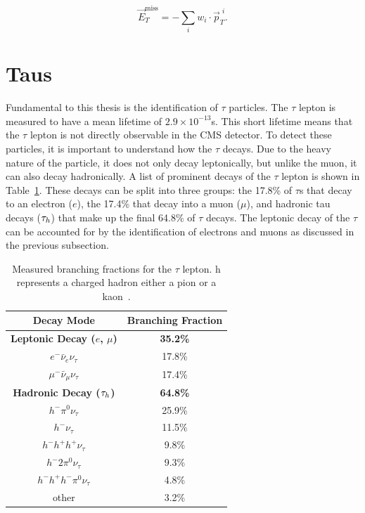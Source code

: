 \begin{equation}
\vec{E}_{T}^{\text{miss}} = - \sum_{i} w_{i} \cdot \vec{p}_{T}^{\hspace{4pt}i}.
\end{equation}

\section{Taus}
\label{sec:taus}

Fundamental to this thesis is the identification of $\tau$ particles.
The $\tau$ lepton is measured to have a mean lifetime of \(2.9 \times 10^{-13}\)s. 
This short lifetime means that the $\tau$ lepton is not directly observable in the \ac{CMS} detector.  
To detect these particles, it is important to understand how the $\tau$ decays. 
Due to the heavy nature of the particle, it does not only decay leptonically, but unlike the muon, it can also decay hadronically.
A list of prominent decays of the $\tau$ lepton is shown in Table~\ref{tab:tau_decay}.
These decays can be split into three groups: the 17.8\% of $\tau$s that decay to an electron ($e$), the 17.4\% that decay into a muon ($\mu$), and hadronic tau decays ($\tau_{h}$) that make up the final 64.8\% of $\tau$ decays. 
The leptonic decay of the $\tau$ can be accounted for by the identification of electrons and muons as discussed in the previous subsection.  \\

\begin{table}[h]
    \centering
    \begin{tabular}{|c|c|}
         \hline
         Decay Mode & Branching Fraction  \\
         \hline
         \hline
         \textbf{Leptonic Decay ($e$, $\mu$)} & \textbf{35.2\%} \\
         $e^- \bar{\nu}_e \nu_\tau $ & 17.8\% \\
         $\mu^- \bar{\nu}_\mu \nu_\tau $ & 17.4\% \\
         \hline
         \textbf{Hadronic Decay ($\tau_{h}$)} & \textbf{64.8\%} \\
         $h^- \pi^0 \nu_\tau $ & 25.9\% \\
         $h^- \nu_\tau$ & 11.5\% \\
         $h^- h^+ h^+ \nu_\tau$ & 9.8\% \\
         $h^- 2\pi^0 \nu_\tau$ & 9.3\% \\
         $h^- h^+ h^- \pi^0 \nu_\tau$ & 4.8\% \\
         other & 3.2\% \\
         \hline
    \end{tabular}
    \caption{Measured branching fractions for the $\tau$ lepton. h represents a charged hadron either a pion or a kaon~\cite{ParticleDataGroup:2022pth}.}
    \label{tab:tau_decay}
\end{table}

